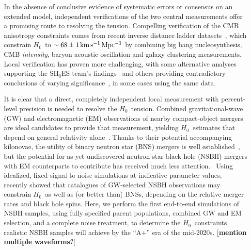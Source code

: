 \documentclass[%
 reprint,
 superscriptaddress,
 nofootinbib,
 amsmath,amssymb,
 aps,
]{revtex4-2}
\newcommand{\hubble}{\ensuremath{H_0}}
\newcommand{\kmsmpc}{\ensuremath{{\rm km\,s^{-1}\,Mpc^{-1}}}}
\begin{document}
In the absence of conclusive evidence of systematic errors or consensus on an extended model, independent verifications of the two central measurements offer a promising route to resolving the tension. Compelling verification of the CMB anisotropy constraints comes from recent inverse distance ladder datasets~\cite{Addison_etal:2017,DES_H_0:2017,Philcox_etal:2020}, which constrain \hubble\ to $\sim 68 \pm 1\,\kmsmpc$ by combining big bang nucleosynthesis, CMB {\it intensity}, baryon acoustic oscillation and galaxy clustering measurements. Local verification has proven more challenging, with some alternative analyses supporting the SH$_0$ES team's findings~\cite{Yuan_etal:2019,Huang_etal:2020,H0LICOW_XIII:2020,TDCOSMO_I:2020,Pesce_etal:2020} and others providing contradictory conclusions of varying significance~\cite{Freedman_etal:2019,Freedman_etal:2020,TDCOSMO_IV:2020,Boruah_etal:2020}, in some cases using the same data.

It is clear that a direct, completely independent local measurement with percent-level precision is needed to resolve the \hubble\ tension. Combined gravitational-wave (GW) and electromagnetic (EM) observations of nearby compact-object mergers are ideal candidates to provide that measurement, yielding \hubble\ estimates that depend on general relativity alone~\cite{Schutz:1986,Holz_Hughes:2005,Dalal:2006,Nissanke_etal:2010,Taylor_etal:2012,Messenger_Read:2012,Nissanke_etal:2013,Oguri:2016,delPozzo:2017,Abbott_etal:2017a,Seto:2018,Chen_etal:2018,Fishbach_etal:2018,Feeney_etal:2018,Mortlock_etal:2019,Soares-Santos_etal:2019,Gray_etal:2019,Palmese_etal:2020,Vasylyev_Filippenko:2020,Chen_etal:2020,Gayathri_etal:2020,Mukherjee_etal:2020}. Thanks to their potential accompanying kilonovae, the utility of binary neutron star (BNS) mergers is well established~\cite{Dalal:2006,Nissanke_etal:2010,Taylor_etal:2012,Messenger_Read:2012,Nissanke_etal:2013,Oguri:2016,delPozzo:2017,Abbott_etal:2017a,Seto:2018,Chen_etal:2018,Fishbach_etal:2018,Feeney_etal:2018,Mortlock_etal:2019,Gray_etal:2019}, but the potential for as-yet undiscovered neutron-star-black-hole (NSBH) mergers with EM counterparts to contribute has received much less attention.~\cite{Nissanke_etal:2010,Nissanke_etal:2013,Vitale_Chen:2018} Using idealized, fixed-signal-to-noise simulations at indicative parameter values,~\citet{Vitale_Chen:2018} recently showed that catalogues of GW-selected NSBH observations may constrain \hubble\ as well as (or better than) BNSs, depending on the relative merger rates and black hole spins. Here, we perform the first end-to-end simulations of NSBH samples, using fully specified parent populations, combined GW and EM selection, and a complete noise treatment, to determine the \hubble\ constraints realistic NSBH samples will achieve by the ``A+'' era of the mid-2020s. {\bf [mention multiple waveforms?]}
\end{document}

